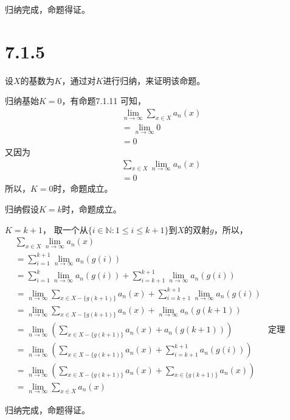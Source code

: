 \documentclass{article}
\theoremstyle{mystyle}
\begin{document}
归纳完成，命题得证。

\section*{7.1.5}

设$X$的基数为$K$，通过对$K$进行归纳，来证明该命题。

归纳基始$K=0$，有命题7.1.11 可知，
\begin{align*}
        & \lim\limits_{n \rightarrow \infty} \sum\limits_{x \in X} a_n(x) \\
        & = \lim\limits_{n \rightarrow \infty} 0                          \\
        & = 0
\end{align*}
又因为
\begin{align*}
        & \sum\limits_{x \in X} \lim\limits_{n \rightarrow \infty} a_n(x) \\
        & = 0
\end{align*}
所以，$K=0$时，命题成立。

归纳假设$K = k$时，命题成立。

$K = k + 1$，
取一个从$\{i \in \mathbb{N}: 1 \leq i \leq k+1\}$到$X$的双射$g$，所以，
\begin{align*}
         & \sum\limits_{x \in X} \lim\limits_{n \rightarrow \infty} a_n(x)                \\
         & = \sum\limits_{i = 1}^{k+1} \lim\limits_{n \rightarrow \infty} a_n(g(i))       \\
         & = \sum\limits_{i = 1}^{k} \lim\limits_{n \rightarrow \infty} a_n(g(i))
       +
       \sum\limits_{i = k+1}^{k+1} \lim\limits_{n \rightarrow \infty} a_n(g(i))           \\
         & = \lim\limits_{n \rightarrow \infty} \sum\limits_{x \in X-\{g(k+1)\}} a_n(x)
       +
       \sum\limits_{i = k+1}^{k+1} \lim\limits_{n \rightarrow \infty} a_n(g(i))           \\
         & = \lim\limits_{n \rightarrow \infty} \sum\limits_{x \in X-\{g(k+1)\}} a_n(x)
       +
       \lim\limits_{n \rightarrow \infty} a_n(g(k+1))                                     \\
         & = \lim\limits_{n \rightarrow \infty}  (\sum\limits_{x \in X-\{g(k+1)\}} a_n(x)
       +
       a_n(g(k+1))
       ) & \textbf{定理6.1.19（a）}                                                           \\
         & = \lim\limits_{n \rightarrow \infty}  (\sum\limits_{x \in X-\{g(k+1)\}} a_n(x)
       +
       \sum\limits_{i = k+1}^{k+1} a_n(g(i))
       )                                                                                  \\
         & = \lim\limits_{n \rightarrow \infty}  (\sum\limits_{x \in X-\{g(k+1)\}} a_n(x)
       +
       \sum\limits_{x \in \{g(k+1)\}} a_n(x)
       )                                                                                  \\
         & = \lim\limits_{n \rightarrow \infty} \sum\limits_{x \in X} a_n(x)
\end{align*}

归纳完成，命题得证。
\end{document}
